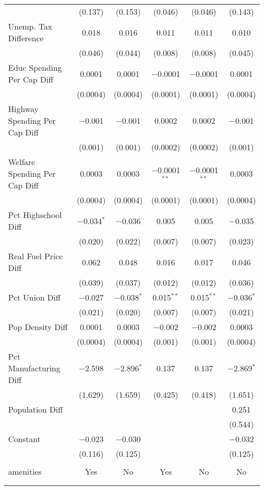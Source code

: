 \begin{table}[!htbp]
\begin{tabular}{@{\extracolsep{5pt}}lccccc}
  & (0.137) & (0.153) & (0.046) & (0.046) & (0.143) \\ 
  Unemp. Tax Difference & 0.018 & 0.016 & 0.011 & 0.011 & 0.010 \\ 
  & (0.046) & (0.044) & (0.008) & (0.008) & (0.045) \\ 
  Educ Spending Per Cap Diff & 0.0001 & 0.0001 & $-$0.0001 & $-$0.0001 & 0.0001 \\ 
  & (0.0004) & (0.0004) & (0.0001) & (0.0001) & (0.0004) \\ 
  Highway Spending Per Cap Diff & $-$0.001 & $-$0.001 & 0.0002 & 0.0002 & $-$0.001 \\ 
  & (0.001) & (0.001) & (0.0002) & (0.0002) & (0.001) \\ 
  Welfare Spending Per Cap Diff & 0.0003 & 0.0003 & $-$0.0001$^{**}$ & $-$0.0001$^{**}$ & 0.0003 \\ 
  & (0.0004) & (0.0004) & (0.0001) & (0.0001) & (0.0004) \\ 
  Pct Highschool Diff & $-$0.034$^{*}$ & $-$0.036 & 0.005 & 0.005 & $-$0.035 \\ 
  & (0.020) & (0.022) & (0.007) & (0.007) & (0.023) \\ 
  Real Fuel Price Diff & 0.062 & 0.048 & 0.016 & 0.017 & 0.046 \\ 
  & (0.039) & (0.037) & (0.012) & (0.012) & (0.036) \\ 
  Pct Union Diff & $-$0.027 & $-$0.038$^{*}$ & 0.015$^{**}$ & 0.015$^{**}$ & $-$0.036$^{*}$ \\ 
  & (0.021) & (0.020) & (0.007) & (0.007) & (0.021) \\ 
  Pop Density Diff & 0.0001 & 0.0003 & $-$0.002 & $-$0.002 & 0.0003 \\ 
  & (0.0004) & (0.0004) & (0.001) & (0.001) & (0.0004) \\ 
  Pct Manufacturing Diff & $-$2.598 & $-$2.896$^{*}$ & 0.137 & 0.137 & $-$2.869$^{*}$ \\ 
  & (1.629) & (1.659) & (0.425) & (0.418) & (1.651) \\ 
  Population Diff &  &  &  &  & 0.251 \\ 
  &  &  &  &  & (0.544) \\ 
  Constant & $-$0.023 & $-$0.030 &  &  & $-$0.032 \\ 
  & (0.116) & (0.125) &  &  & (0.125) \\ 
 \hline \\[-1.8ex] 
amenities & Yes & No & Yes & No & No \\ 
\hline \\[-1.8ex] 
\hline 
\hline \\[-1.8ex] 
\end{tabular} 
\end{table} 
